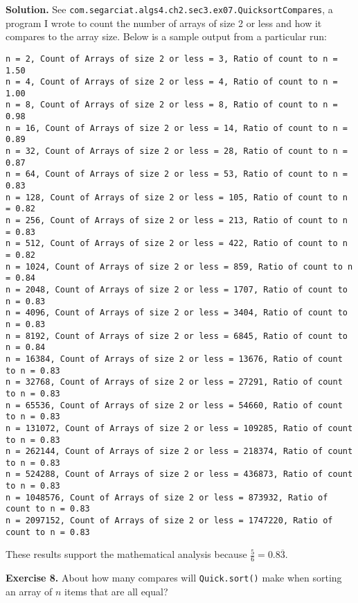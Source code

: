 \documentclass[12pt, a4paper]{article}
\newenvironment{ex}[2][Exercise]
{\par\medskip\noindent \textbf{#1 #2.}}
{\medskip}
\newenvironment{sol}[1][Solution]
{\par\medskip\noindent \textbf{#1.} }
{\medskip}
\begin{document}
\begin{sol}
		See \texttt{com.segarciat.algs4.ch2.sec3.ex07.QuicksortCompares}, a program
		I wrote to count the number of arrays of size 2 or less and how it compares to
		the array size. Below is a sample output from a particular run:
		\begin{lstlisting}[language={}]
n = 2, Count of Arrays of size 2 or less = 3, Ratio of count to n = 1.50
n = 4, Count of Arrays of size 2 or less = 4, Ratio of count to n = 1.00
n = 8, Count of Arrays of size 2 or less = 8, Ratio of count to n = 0.98
n = 16, Count of Arrays of size 2 or less = 14, Ratio of count to n = 0.89
n = 32, Count of Arrays of size 2 or less = 28, Ratio of count to n = 0.87
n = 64, Count of Arrays of size 2 or less = 53, Ratio of count to n = 0.83
n = 128, Count of Arrays of size 2 or less = 105, Ratio of count to n = 0.82
n = 256, Count of Arrays of size 2 or less = 213, Ratio of count to n = 0.83
n = 512, Count of Arrays of size 2 or less = 422, Ratio of count to n = 0.82
n = 1024, Count of Arrays of size 2 or less = 859, Ratio of count to n = 0.84
n = 2048, Count of Arrays of size 2 or less = 1707, Ratio of count to n = 0.83
n = 4096, Count of Arrays of size 2 or less = 3404, Ratio of count to n = 0.83
n = 8192, Count of Arrays of size 2 or less = 6845, Ratio of count to n = 0.84
n = 16384, Count of Arrays of size 2 or less = 13676, Ratio of count to n = 0.83
n = 32768, Count of Arrays of size 2 or less = 27291, Ratio of count to n = 0.83
n = 65536, Count of Arrays of size 2 or less = 54660, Ratio of count to n = 0.83
n = 131072, Count of Arrays of size 2 or less = 109285, Ratio of count to n = 0.83
n = 262144, Count of Arrays of size 2 or less = 218374, Ratio of count to n = 0.83
n = 524288, Count of Arrays of size 2 or less = 436873, Ratio of count to n = 0.83
n = 1048576, Count of Arrays of size 2 or less = 873932, Ratio of count to n = 0.83
n = 2097152, Count of Arrays of size 2 or less = 1747220, Ratio of count to n = 0.83
		\end{lstlisting}
		These results support the mathematical analysis because $\frac{5}{6}=0.8\overline{3}$.
	\end{sol}
	\begin{ex}{8}
		About how many compares will \texttt{Quick.sort()} make when sorting an array of $n$
		items that are all equal?
	\end{ex}
\end{document}
